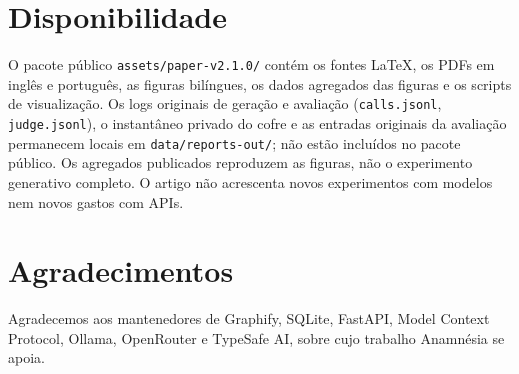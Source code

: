 \documentclass[conference,onecolumn,11pt]{IEEEtran}
\newcommand{\anam}{Anam\-n\'esia}
\begin{document}
\section*{Disponibilidade}
O pacote público \texttt{assets/paper-v2.1.0/} contém os fontes LaTeX, os PDFs em inglês e português, as figuras bilíngues, os dados agregados das figuras e os scripts de visualização. Os logs originais de geração e avaliação (\texttt{calls.jsonl}, \texttt{judge.jsonl}), o instantâneo privado do cofre e as entradas originais da avaliação permanecem locais em \texttt{data/reports-out/}; não estão incluídos no pacote público. Os agregados publicados reproduzem as figuras, não o experimento generativo completo. O artigo não acrescenta novos experimentos com modelos nem novos gastos com APIs.

\section*{Agradecimentos}
Agradecemos aos mantenedores de Graphify, SQLite, FastAPI, Model Context Protocol, Ollama, OpenRouter e TypeSafe AI, sobre cujo trabalho \anam{} se apoia.



\end{document}
